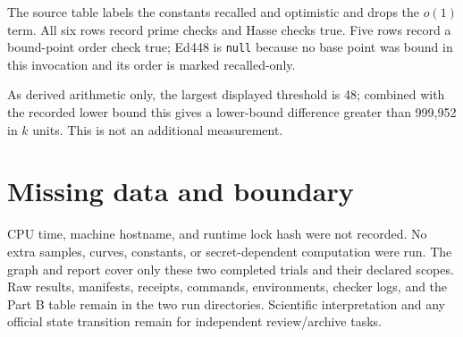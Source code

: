 \documentclass[10pt]{article}
\newcommand{\code}[1]{\texttt{\small #1}}
\begin{document}
The source table labels the constants recalled and optimistic and drops the
$o(1)$ term. All six rows record prime checks and Hasse checks true. Five rows
record a bound-point order check true; Ed448 is \code{null} because no base
point was bound in this invocation and its order is marked recalled-only.

As derived arithmetic only, the largest displayed threshold is 48; combined
with the recorded lower bound this gives a lower-bound difference greater than
999,952 in $k$ units. This is not an additional measurement.

\section*{Missing data and boundary}
CPU time, machine hostname, and runtime lock hash were not recorded. No extra
samples, curves, constants, or secret-dependent computation were run. The
graph and report cover only these two completed trials and their declared
scopes. Raw results, manifests, receipts, commands, environments, checker
logs, and the Part B table remain in the two run directories. Scientific
interpretation and any official state transition remain for independent
review/archive tasks.
\end{document}
